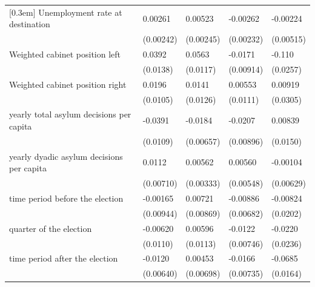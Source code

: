 \documentclass[a4paper,12pt]{article}
\newcommand{\sym}[1]{\rlap{#1}}
\begin{document}
\begin{table}[htbp]
\begin{tabularx}{\textwidth}{l*{4}{Y}}
[0.3em]
Unemployment rate at destination        &   0.00261         &   0.00523\sym{*}  &  -0.00262         &  -0.00224         \\
                                        & (0.00242)         & (0.00245)         & (0.00232)         & (0.00515)         \\
[0.3em]
Weighted cabinet position left          &    0.0392\sym{**} &    0.0563\sym{***}&   -0.0171         &    -0.110\sym{***}\\
                                        &  (0.0138)         &  (0.0117)         & (0.00914)         &  (0.0257)         \\
[0.3em]
Weighted cabinet position right         &    0.0196         &    0.0141         &   0.00553         &   0.00919         \\
                                        &  (0.0105)         &  (0.0126)         &  (0.0111)         &  (0.0305)         \\
[0.3em]
yearly total asylum decisions per capita&   -0.0391\sym{***}&   -0.0184\sym{**} &   -0.0207\sym{*}  &   0.00839         \\
                                        &  (0.0109)         & (0.00657)         & (0.00896)         &  (0.0150)         \\
[0.3em]
yearly dyadic asylum decisions per capita&    0.0112         &   0.00562         &   0.00560         &  -0.00104         \\
                                        & (0.00710)         & (0.00333)         & (0.00548)         & (0.00629)         \\
[0.3em]
time period before the election         &  -0.00165         &   0.00721         &  -0.00886         &  -0.00824         \\
                                        & (0.00944)         & (0.00869)         & (0.00682)         &  (0.0202)         \\
[0.3em]
quarter of the election                 &  -0.00620         &   0.00596         &   -0.0122         &   -0.0220         \\
                                        &  (0.0110)         &  (0.0113)         & (0.00746)         &  (0.0236)         \\
[0.3em]
time period after the election          &   -0.0120         &   0.00453         &   -0.0166\sym{*}  &   -0.0685\sym{***}\\
                                        & (0.00640)         & (0.00698)         & (0.00735)         &  (0.0164)         \\

\end{tabularx}
\end{table}
\end{document}
